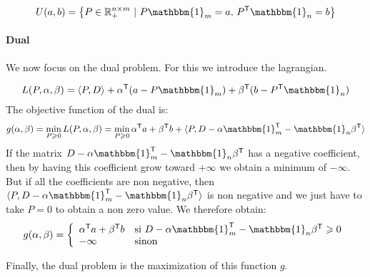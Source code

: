 $$ U(a, b) = \left\{ P \in \R_+^{n \times m}~|~P \mathbbm{1}_m = a, \, P^\trans \mathbbm{1}_n = b \right\} $$


\paragraph{Dual} We now focus on the dual problem. For this we introduce the lagrangian.

$$ L(P, \alpha, \beta) = \langle P, D \rangle + \alpha^\trans (a - P \mathbbm{1}_m) + \beta^\trans (b - P^\trans \mathbbm{1}_n) $$
The objective function of the dual is:
$$ g(\alpha, \beta) = \min_{P \geqslant 0} L(P, \alpha, \beta) = \min_{P \geqslant 0} \alpha^\trans a + \beta^\trans b + \langle P, D - \alpha \mathbbm{1}_m^\trans - \mathbbm{1}_n \beta^\trans \rangle $$
If the matrix $D - \alpha \mathbbm{1}_m^\trans - \mathbbm{1}_n \beta^\trans$ has a negative coefficient, then by having this coefficient grow toward $+\infty$ we obtain a minimum of $-\infty$. But if all the coefficients are non negative, then  $\langle P, D - \alpha
\mathbbm{1}_m^\trans - \mathbbm{1}_n \beta^\trans \rangle$ is non negative and we just have to take $P=0$ to obtain a non zero value. We therefore obtain:
$$ g(\alpha, \beta) = \left\{ \begin{array}{ll}
\alpha^\trans a + \beta^\trans b & \text{si } D - \alpha \mathbbm{1}_m^\trans - \mathbbm{1}_n \beta^\trans \geqslant 0 \\
-\infty & \text{sinon}
\end{array}\right. $$

Finally, the dual problem is the maximization of this function $g$.


